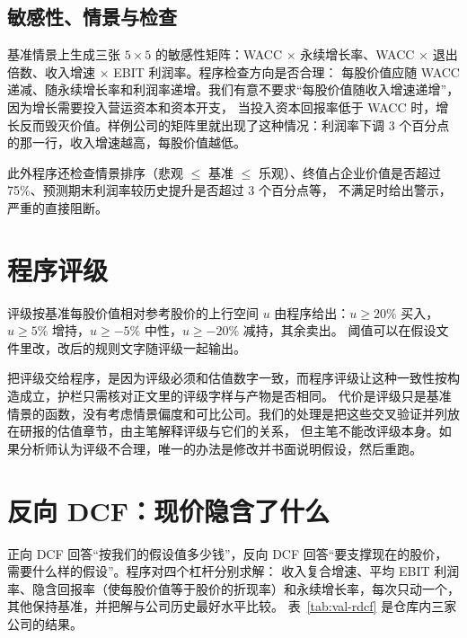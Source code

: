 \subsection{敏感性、情景与检查}

基准情景上生成三张 $5\times5$ 的敏感性矩阵：WACC × 永续增长率、WACC × 退出倍数、收入增速 × EBIT 利润率。程序检查方向是否合理：
每股价值应随 WACC 递减、随永续增长率和利润率递增。我们有意不要求“每股价值随收入增速递增”，因为增长需要投入营运资本和资本开支，
当投入资本回报率低于 WACC 时，增长反而毁灭价值。样例公司的矩阵里就出现了这种情况：利润率下调 3 个百分点的那一行，收入增速越高，每股价值越低。

此外程序还检查情景排序（悲观 $\le$ 基准 $\le$ 乐观）、终值占企业价值是否超过 75\%、预测期末利润率较历史提升是否超过 3 个百分点等，
不满足时给出警示，严重的直接阻断。

\section{程序评级}

评级按基准每股价值相对参考股价的上行空间 $u$ 由程序给出：$u\ge20\%$ 买入，$u\ge5\%$ 增持，$u\ge-5\%$ 中性，$u\ge-20\%$ 减持，其余卖出。
阈值可以在假设文件里改，改后的规则文字随评级一起输出。

把评级交给程序，是因为评级必须和估值数字一致，而程序评级让这种一致性按构造成立，护栏只需核对正文里的评级字样与产物是否相同。
代价是评级只是基准情景的函数，没有考虑情景偏度和可比公司。我们的处理是把这些交叉验证并列放在研报的估值章节，由主笔解释评级与它们的关系，
但主笔不能改评级本身。如果分析师认为评级不合理，唯一的办法是修改并书面说明假设，然后重跑。

\section{反向 DCF：现价隐含了什么}

正向 DCF 回答“按我们的假设值多少钱”，反向 DCF 回答“要支撑现在的股价，需要什么样的假设”。程序对四个杠杆分别求解：
收入复合增速、平均 EBIT 利润率、隐含回报率（使每股价值等于股价的折现率）和永续增长率，每次只动一个，其他保持基准，并把解与公司历史最好水平比较。
表~\ref{tab:val-rdcf} 是仓库内三家公司的结果。

